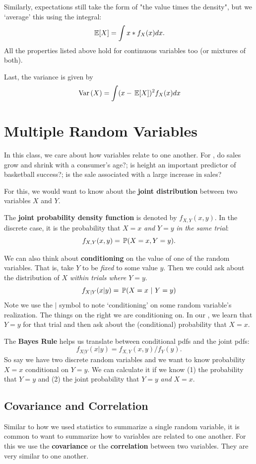 \documentclass[12pt]{article}
\begin{document}
Similarly, expectations still take the form of "the value times the density", but we `average' this using the integral:
$$
  \E{X} = \int x * f_{X}(x) dx.
$$
All the properties listed above hold for continuous variables too (or mixtures of both). 

Last, the variance is given by
$$
  \var{X} = \int (x - \expec{X})^2 f_{X}(x) dx
$$


\section{Multiple Random Variables}

In this class, we care about how variables relate to one another. For , do sales grow and shrink with a consumer's age?; is height an important predictor of basketball success?; is the sale associated with a large increase in sales?

For this, we would want to know about the \textbf{joint distribution} between two variables $X$ and $Y$. 

The \textbf{joint probability density function} is denoted by $f_{X,Y}(x, y)$. In the discrete case, it is the probability that $X = x$ \emph{and} $Y = y$ \emph{in the same trial}:
$$
  f_{X,Y}(x, y) = \P{X = x, Y = y}.
$$

We can also think about \textbf{conditioning} on the value of one of the random variables. That is, take $Y$ to be \emph{fixed} to some value $y$. Then we could ask about the distribution of $X$ \emph{within trials where $Y = y$}.
$$
  f_{X \vert Y}(x \vert y) = \P{X = x}{Y = y}
$$
Note we use the $\vert$ symbol to note `conditioning' on some random variable's realization. The things on the right we are conditioning on. In our , we learn that $Y = y$ for that trial and then ask about the (conditional) probability that $X = x$.

The \textbf{Bayes Rule} helps us translate between conditional pdfs and the joint pdfs:
$$
  f_{X \vert Y}(x \vert y) = f_{X,Y}(x, y) / f_{Y}(y).
$$
So say we have two discrete random variables and we want to know probability $X = x$ conditional on $Y = y$. We can calculate it if we know (1) the probability that $Y = y$ and (2) the joint probability that $Y = y$ \emph{and} $X = x$. 


\subsection*{Covariance and Correlation}

Similar to how we used statistics to summarize a single random variable, it is common to want to summarize how to variables are related to one another. For this we use the \textbf{covariance} or the \textbf{correlation} between two variables. They are very similar to one another.
\end{document}
